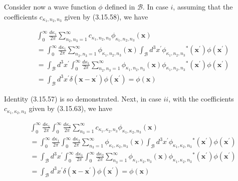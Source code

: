 \documentclass{article}
\begin{document}
Consider now a wave function $\phi$ defined in $\mathcal{B}$. In case $i$, assuming that the coefficients $c_{\kappa_{1}, n_{2}, n_{3}}$ given by (3.15.58), we have
 
\begin{align*}
& \int_{0}^{\infty} \frac{d \kappa_{1}}{2 \pi} \sum_{n_{2}, n_{3}=1}^{\infty} c_{\kappa_{1}, n_{2}, n_{3}} \phi_{\kappa_{1}, n_{2}, n_{3}}(\boldsymbol{x})  \tag{3.15.83}\\
& =\int_{0}^{\infty} \frac{d \kappa_{1}}{2 \pi} \sum_{n_{2}, n_{3}=1}^{\infty} \phi_{\kappa_{1}, n_{2}, n_{3}}(\boldsymbol{x}) \int_{\mathcal{B}} d^{3} x^{\prime} \phi_{\kappa_{1}, n_{2}, n_{3}}{ }^{*}\left(\boldsymbol{x}^{\prime}\right) \phi\left(\boldsymbol{x}^{\prime}\right) \\
& =\int_{\mathcal{B}} d^{3} x^{\prime} \int_{0}^{\infty} \frac{d \kappa_{1}}{2 \pi} \sum_{n_{2}, n_{3}=1}^{\infty} \phi_{\kappa_{1}, n_{2}, n_{3}}(\boldsymbol{x}) \phi_{\kappa_{1}, n_{2}, n_{3}}{ }^{*}\left(\boldsymbol{x}^{\prime}\right) \phi\left(\boldsymbol{x}^{\prime}\right) \\
& =\int_{\mathcal{B}} d^{3} x^{\prime} \delta\left(\boldsymbol{x}-\boldsymbol{x}^{\prime}\right) \phi\left(\boldsymbol{x}^{\prime}\right)=\phi(\boldsymbol{x})
\end{align*}
 

Identity (3.15.57) is so demonstrated. Next, in case $i i$, with the coefficients $c_{\kappa_{1}, \kappa_{2}, n_{3}}$
given by (3.15.63), we have
 
\begin{align*}
& \int_{0}^{\infty} \frac{d \kappa_{1}}{2 \pi} \int_{0}^{\infty} \frac{d \kappa_{2}}{2 \pi} \sum_{n_{3}=1}^{\infty} c_{\kappa_{1}, \kappa_{2}, n_{3}} \phi_{\kappa_{1}, \kappa_{2}, n_{3}}(\boldsymbol{x})  \tag{3.15.84}\\
& =\int_{0}^{\infty} \frac{d \kappa_{1}}{2 \pi} \int_{0}^{\infty} \frac{d \kappa_{2}}{2 \pi} \sum_{n_{3}=1}^{\infty} \phi_{\kappa_{1}, \kappa_{2}, n_{3}}(\boldsymbol{x}) \int_{\mathcal{B}} d^{3} x^{\prime} \phi_{\kappa_{1}, \kappa_{2}, n_{3}}{ }^{*}\left(\boldsymbol{x}^{\prime}\right) \phi\left(\boldsymbol{x}^{\prime}\right) \\
& =\int_{\mathcal{B}} d^{3} x^{\prime} \int_{0}^{\infty} \frac{d \kappa_{1}}{2 \pi} \int_{0}^{\infty} \frac{d \kappa_{2}}{2 \pi} \sum_{n_{3}=1}^{\infty} \phi_{\kappa_{1}, \kappa_{2}, n_{3}}(\boldsymbol{x}) \phi_{\kappa_{1}, \kappa_{2}, n_{3}}{ }^{*}\left(\boldsymbol{x}^{\prime}\right) \phi\left(\boldsymbol{x}^{\prime}\right) \\
& =\int_{\mathcal{B}} d^{3} x^{\prime} \delta\left(\boldsymbol{x}-\boldsymbol{x}^{\prime}\right) \phi\left(\boldsymbol{x}^{\prime}\right)=\phi(\boldsymbol{x})
\end{align*}
 
\end{document}
